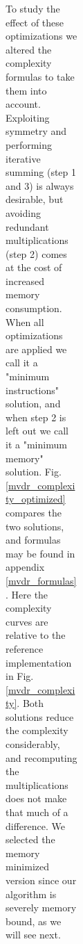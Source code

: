 \documentclass[12pt,journal,draftclsnofoot,onecolumn]{IEEEtran}
\newcommand\1{\vec 1}
\begin{document}
\begin{figure}[H]
\begin{figure}[!t]
\begin{figure}[!t]
\begin{figure}[t]
\begin{figure}[!t]
To study the effect of these optimizations we altered the complexity formulas to take them into account. Exploiting symmetry and performing iterative summing (step 1 and 3) is always desirable, but avoiding redundant multiplications (step 2) comes at the cost of increased memory consumption. When all optimizations are applied we call it a "minimum instructions" solution, and when step 2 is left out we call it a "minimum memory" solution. Fig. \ref{mvdr_complexity_optimized} compares the two solutions, and formulas may be found in appendix \ref{mvdr_formulas}. Here the complexity curves are relative to the reference implementation in Fig. \ref{mvdr_complexity}. Both solutions reduce the complexity considerably, and recomputing the multiplications does not make that much of a difference. We selected the memory minimized version since our algorithm is severely memory bound, as we will see next.


\end{figure}
\end{figure}
\end{figure}
\end{figure}
\end{figure}
\end{document}
